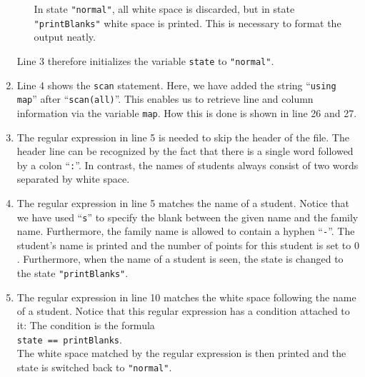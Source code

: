 \begin{enumerate}
\begin{enumerate}
            In state \texttt{"normal"}, all white space is discarded, but in state
            \texttt{"printBlanks"} white space is printed.  This is necessary to format
            the output neatly.
      \end{enumerate}
      Line 3 therefore initializes the variable \texttt{state} to \texttt{"normal"}.
\item Line 4 shows the \texttt{scan} statement.  Here, we have added the string ``\texttt{using map}'' 
      after ``\texttt{scan(all)}''.  This enables us to retrieve line and column information via the
      variable \texttt{map}.  How this is done is shown in line 26 and 27.
\item The regular expression in line 5 is needed to skip the header of the file.  The
      header line can be recognized by the fact that there is a single word followed by a colon
      ``\texttt{:}''.   In contrast, the names of students always consist of two words separated by
      white space.
\item The regular expression in line 5 matches the name of a student.  Notice that we have used 
      ``\texttt{s}'' to specify the blank between the given name and the family name.
      Furthermore, the family name is allowed to contain a hyphen ``\texttt{-}''.
      The student's name is printed and the number of points for this student is set to $0$.
      Furthermore, when the name of a student is seen, the state is changed to the state
      \texttt{"printBlanks"}.
\item The regular expression in line 10 matches the white space following the name of a
      student.  Notice that this regular expression has a condition attached to it: 
      The condition is the formula
      \\[0.2cm]
      \hspace*{1.3cm}
      \texttt{state == printBlanks}.
      \\[0.2cm]
      The white space matched by the regular expression is then printed and the state is switched back to
      \texttt{"normal"}.


\end{enumerate}
